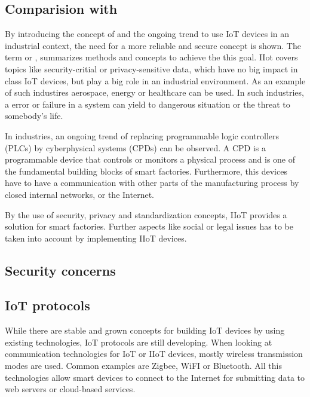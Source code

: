 \subsection{Comparision with }
By introducing the concept of  and the ongoing trend to use IoT devices in an industrial context, the need for a more reliable and secure concept is shown. The term  or , summarizes methods and concepts to achieve the this goal. IIot covers topics like security-critial or privacy-sensitive data, which have no big impact in class IoT devices, but play a big role in an industrial environment\cite{iiot}. As an example of such industires aerospace, energy or healthcare can be used. In such industries, a error or failure in a system can yield to dangerous situation or the threat to somebody's life\cite{iiot2}.

In industries, an ongoing trend of replacing programmable logic controllers (PLCs) by cyberphysical systems (CPDs) can be observed. A CPD is a programmable device that controls or monitors a physical process and is one of the fundamental building blocks of smart factories. Furthermore, this devices have to have a communication with other parts of the manufacturing process by closed internal networks, or the Internet\cite{iiot}.

By the use of security, privacy and standardization concepts, IIoT provides a solution for smart factories. Further aspects like social or legal issues has to be taken into account by implementing IIoT devices\cite{iiot}.

\subsection{Security concerns}

\subsection{IoT protocols}
While there are stable and grown concepts for building IoT devices by using existing technologies, IoT protocols are still developing. When looking at communication technologies for IoT or IIoT devices, mostly wireless transmission modes are used. Common examples are Zigbee, WiFI or Bluetooth. All this technologies allow smart devices to connect to the Internet for submitting data to web servers or cloud-based services\cite{iotprotocols}.

